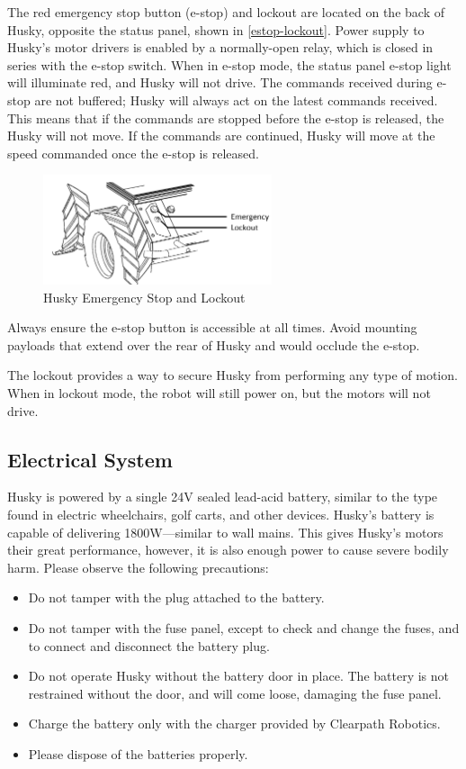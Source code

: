 \documentclass[]{clearpath-latex/clearpath-manual}
\begin{document}
The red emergency stop button (e-stop) and lockout are located on the back of Husky, opposite the status panel, 
shown in \autoref{estop-lockout}. Power supply to Husky’s motor drivers is enabled by a normally-open relay, 
which is closed in series with the e-stop switch. When in e-stop mode, the status panel e-stop light will illuminate red, 
and Husky will not drive. The commands received during e-stop are not buffered; Husky will always act on the latest commands 
received. This means that if the commands are stopped before the e-stop is released, the Husky will not move. If the 
commands are continued, Husky will move at the speed commanded once the e-stop is released.

\begin{figure}[h]
	\centering
	\includegraphics[width=0.6\textwidth]{estop-lockout.png}
	\caption{Husky Emergency Stop and Lockout}
	\label{estop-lockout}
\end{figure}

Always ensure the e-stop button is accessible at all times. Avoid mounting payloads that extend over the rear of Husky and would occlude the e-stop.

The lockout provides a way to secure Husky from performing any type of motion. When in lockout mode, the robot will still power on, but the motors will not drive.

\subsection{Electrical System}
Husky is powered by a single 24V sealed lead-acid battery, similar to the type found in electric wheelchairs, golf carts, 
and other devices. Husky’s battery is capable of delivering 1800W—similar to wall mains. This gives Husky’s motors their 
great performance, however, it is also enough power to cause severe bodily harm. Please observe the following precautions:

\begin{itemize}
	\item Do not tamper with the plug attached to the battery.
	\item Do not tamper with the fuse panel, except to check and change the fuses, and to connect and disconnect the battery plug.
	\item Do not operate Husky without the battery door in place. The battery is not restrained without the door, and will come loose, damaging the fuse panel.
	\item Charge the battery only with the charger provided by Clearpath Robotics.
	\item Please dispose of the batteries properly.
\end{itemize}
	
\end{document}
